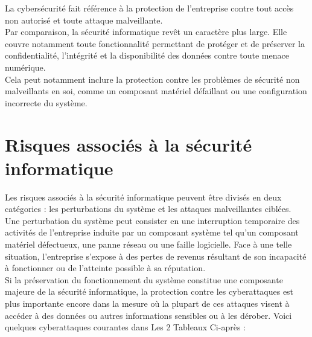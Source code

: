  La cybersécurité fait référence à la protection de l’entreprise contre tout accès non autorisé et toute attaque malveillante.\\
 
 Par comparaison, la sécurité informatique revêt un caractère plus large. Elle couvre notamment toute fonctionnalité permettant de protéger et de préserver la confidentialité, l’intégrité et la disponibilité des données contre toute menace numérique.\\ Cela peut notamment inclure la protection contre les problèmes de sécurité non malveillants en soi, comme un composant matériel défaillant ou une configuration incorrecte du système.\\
 \section{Risques associés à la sécurité informatique}
 Les risques associés à la sécurité informatique peuvent être divisés en deux catégories : les perturbations du système et les attaques malveillantes ciblées.\\
 
 Une perturbation du système peut consister en une interruption temporaire des activités de l’entreprise induite par un composant système tel qu’un composant matériel défectueux, une panne réseau ou une faille logicielle. Face à une telle situation, l’entreprise s’expose à des pertes de revenus résultant de son incapacité à fonctionner ou de l’atteinte possible à sa réputation.\\
 
 Si la préservation du fonctionnement du système constitue une composante majeure de la sécurité informatique, la protection contre les cyberattaques est plus importante encore dans la mesure où la plupart de ces attaques visent à accéder à des données ou autres informations sensibles ou à les dérober. Voici quelques cyberattaques courantes dans Les 2 Tableaux Ci-après :
 

